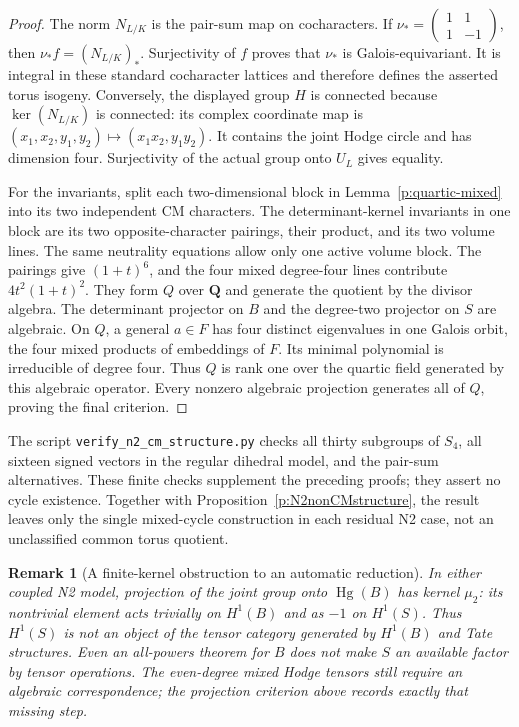 \documentclass[10pt,reqno]{article}
\theoremstyle{emphasizedplain}
\theoremstyle{emphasizeddefinition}
\theoremstyle{emphasizeddefinition}
\newtheorem{remark}[theorem]{Remark}
\DeclareMathOperator{\Hg}{Hg}
\newcommand{\Q}{\mathbf Q}
\begin{document}
\begin{proof}
The norm $N_{L/K}$ is the pair-sum map on cocharacters. If
$\nu_*=\left(\begin{smallmatrix}1&1\\1&-1\end{smallmatrix}\right)$,
then $\nu_*f=(N_{L/K})_*$. Surjectivity of $f$ proves that
$\nu_*$ is Galois-equivariant. It is integral in these standard
cocharacter lattices and therefore defines the asserted torus
isogeny. Conversely, the displayed group $H$ is connected
because $\ker(N_{L/K})$ is connected: its complex coordinate map
is $(x_1,x_2,y_1,y_2)\mapsto(x_1x_2,y_1y_2)$.
It contains the joint Hodge circle and has dimension four.
Surjectivity of the actual group onto $U_L$ gives equality.

For the invariants, split each two-dimensional block in
Lemma~\ref{p:quartic-mixed} into its two independent CM characters.
The determinant-kernel invariants in one block are its two
opposite-character pairings, their product, and its two volume
lines. The same neutrality equations allow only one active
volume block. The pairings give $(1+t)^6$, and the four mixed
degree-four lines contribute $4t^2(1+t)^2$. They form $Q$ over
$\Q$ and generate the quotient by the divisor algebra.
The determinant projector on $B$ and the degree-two projector
on $S$ are algebraic. On $Q$, a general $a\in F$ has four
distinct eigenvalues in one Galois orbit, the four mixed products
of embeddings of $F$. Its minimal polynomial is irreducible
of degree four. Thus $Q$ is rank one over the quartic field
generated by this algebraic operator. Every nonzero algebraic
projection generates all of $Q$, proving the final criterion.
\end{proof}

The script \texttt{verify\_n2\_cm\_structure.py} checks all thirty
subgroups of $S_4$, all sixteen signed vectors in the regular
dihedral model, and the pair-sum alternatives. These finite
checks supplement the preceding proofs; they assert no cycle
existence. Together with Proposition~\ref{p:N2nonCMstructure},
the result leaves only the single mixed-cycle construction in
each residual N2 case, not an unclassified common torus quotient.

\begin{remark}[A finite-kernel obstruction to an automatic reduction]
In either coupled N2 model, projection of the joint group onto
$\Hg(B)$ has kernel $\mu_2$: its nontrivial element acts trivially
on $H^1(B)$ and as $-1$ on $H^1(S)$. Thus $H^1(S)$ is not an
object of the tensor category generated by $H^1(B)$ and Tate
structures. Even an all-powers theorem for $B$ does not make $S$
an available factor by tensor operations. The even-degree
mixed Hodge tensors still require an algebraic correspondence;
the projection criterion above records exactly that missing step.
\end{remark}
\end{document}
